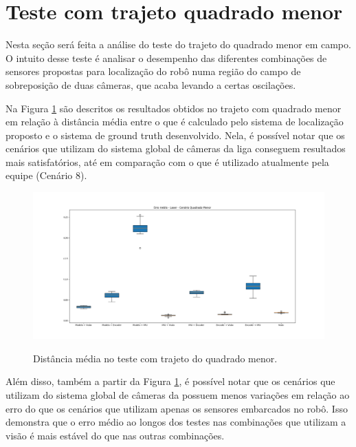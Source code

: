 \documentclass[acronym, symbols, table]{fei}
\begin{document}
	\section{Teste com trajeto quadrado menor}
	
	Nesta seção será feita a análise do teste do trajeto do quadrado menor em campo. O intuito desse teste é analisar o desempenho das diferentes combinações de sensores propostas para localização do robô numa região do campo de sobreposição de duas câmeras, que acaba levando a certas oscilações.
	
	Na Figura \ref{fig:erro_medio_distancia_quad_menor} são descritos os resultados obtidos no trajeto com quadrado menor em relação à distância média entre o que é calculado pelo sistema de localização proposto e o sistema de ground truth desenvolvido. Nela, é possível notar que os cenários que utilizam do sistema global de câmeras da liga conseguem resultados mais satisfatórios, até em comparação com o que é utilizado atualmente pela equipe (Cenário 8).
	
	\begin{figure}[!htb]
		\centering
		\caption{Distância média no teste com trajeto do quadrado menor.}
		\includegraphics[width=1.0\textwidth]{../Dados/Graficos-Resultados/erro_medio_distancia_quadrado_menor.png}
		\label{fig:erro_medio_distancia_quad_menor}
	\end{figure}

	Além disso, também a partir da Figura \ref{fig:erro_medio_distancia_quad_menor}, é possível notar que os cenários que utilizam do sistema global de câmeras da  possuem menos variações em relação ao erro do que os cenários que utilizam apenas os sensores embarcados no robô. Isso demonstra que o erro médio ao longos dos testes nas combinações que utilizam a visão é mais estável do que nas outras combinações.
	
\end{document}
